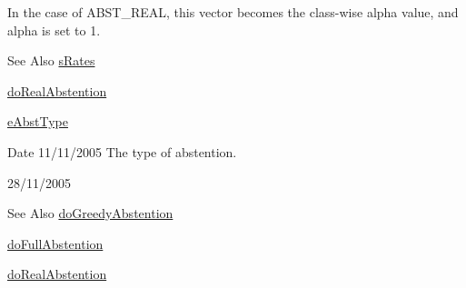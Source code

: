 In the case of A\-B\-S\-T\-\_\-\-R\-E\-A\-L, this vector becomes the class-\/wise alpha value, and alpha is set to 1. \begin{DoxySeeAlso}{See Also}
\hyperlink{structMultiBoost_1_1sRates}{s\-Rates} 

\hyperlink{classMultiBoost_1_1AbstainableLearner_a04438bf3df3599fe42ca26771b6b2aff}{do\-Real\-Abstention} 

\hyperlink{classMultiBoost_1_1AbstainableLearner_a913d773affdee935e319707266a29599}{e\-Abst\-Type} 
\end{DoxySeeAlso}
\begin{DoxyDate}{Date}
11/11/2005 The type of abstention. 

28/11/2005 
\end{DoxyDate}
\begin{DoxySeeAlso}{See Also}
\hyperlink{classMultiBoost_1_1AbstainableLearner_a022edc8c1b04c21720f56c0562db10a7}{do\-Greedy\-Abstention} 

\hyperlink{classMultiBoost_1_1AbstainableLearner_a08b11f234d6f857343432a7f6c2d0c03}{do\-Full\-Abstention} 

\hyperlink{classMultiBoost_1_1AbstainableLearner_a04438bf3df3599fe42ca26771b6b2aff}{do\-Real\-Abstention} 
\end{DoxySeeAlso}
